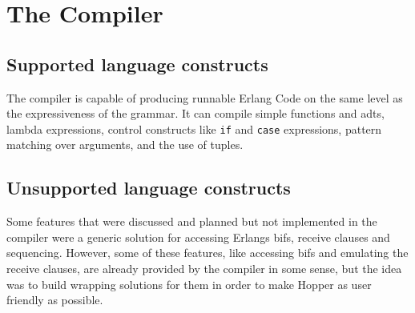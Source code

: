 \section{The Compiler}


\subsection{Supported language constructs}
The compiler is capable of producing runnable Erlang Code on the same level as the expressiveness of the grammar. It can compile simple functions and \glspl{adt}, lambda expressions, control constructs like \texttt{if} and \texttt{case} expressions, pattern matching over arguments, and the use of tuples.

\subsection{Unsupported language constructs}
Some features that were discussed and planned but not implemented in the compiler were a generic solution for accessing Erlangs \glspl{bif}, receive clauses and sequencing. However, some of these features, like accessing \glspl{bif} and emulating the receive clauses, are already provided by the compiler in some sense, but the idea was to build wrapping solutions for them in order to make Hopper as user friendly as possible.